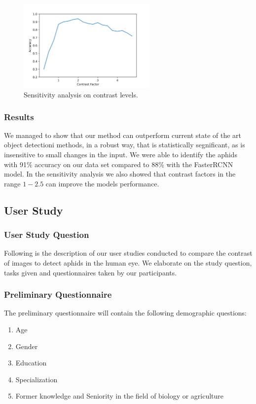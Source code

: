 \documentclass{article}
\begin{document}
\begin{figure}
    \centering
    \includegraphics[width=0.6\textwidth]{images/sensitivity.png}
    \caption{Sensitivity analysis on contrast levels.}
    \label{fig:sensitivity}
\end{figure}

\subsubsection{Results}
We managed to show that our method can outperform current state of the art object detectioni methods,
in a robust way, that is statistically segnificant, as is insensitive to small changes in the input.
We were able to identify the aphids with 91\% accuracy on our data set compared to 88\% with the FasterRCNN model.
In the sensitivity analysis we also showed that contrast factors in the range \(1-2.5\) can improve the models performance.

\newpage
\subsection{User Study}

\subsubsection{User Study Question}
Following is the description of our user studies conducted to compare the contrast of images to detect aphids in the human eye. We elaborate on the study question, tasks given and questionnaires taken by our participants.
\subsubsection{Preliminary Questionnaire}
The preliminary questionnaire will contain the following demographic questions: 

\begin{enumerate}
    \item Age
    \item Gender
    \item Education
    \item Specialization
    \item Former knowledge and Seniority in the field of biology or agriculture
\end{enumerate}
\end{document}
